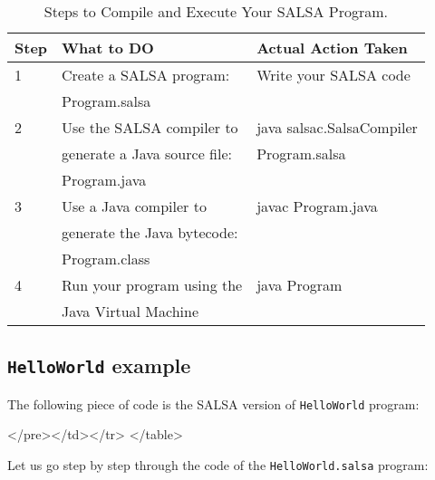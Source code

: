 \begin{table}[top]
\caption{Steps to Compile and Execute Your SALSA Program.}
\label{tbl1}        %
\begin{center}
\begin{tabular}{|l|l|l|}
\hline
Step       & What to DO     & Actual Action Taken  \\
\hline\hline
1           & Create a SALSA program:     & Write your SALSA code\\
            & Program.salsa             & \\
\hline
2           & Use the SALSA compiler to   & java salsac.SalsaCompiler \\
            & generate a Java source file:&    Program.salsa\\
            & Program.java              & \\
\hline
3           & Use a Java compiler to      & javac Program.java \\
            & generate the Java bytecode: & \\
            & Program.class             & \\
\hline
4           & Run your program using the  & java Program \\
            & Java Virtual Machine        & \\ 
\hline
\end{tabular}
\end{center}
\end{table}

\subsection{{\tt HelloWorld} example}
The following piece of code is the SALSA version of {\tt HelloWorld}
program:
{\singlespace

}
\begin{htmlonly}

 \begin{rawhtml} 
   </pre></td></tr>
  </table>
\end{rawhtml} 
\end{htmlonly} 

Let us go step by step through the code of the {\tt HelloWorld.salsa} 
program:

